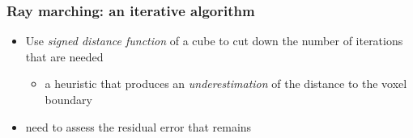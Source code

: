 \documentclass{beamer}
\begin{document}
\begin{frame}
\begin{figure}
  \end{figure}
\end{frame}

\begin{frame}
  \frametitle{Ray marching: an iterative algorithm}
  \begin{itemize}
    \item Use \textsl{signed distance function} of a cube to cut down the number of iterations that are needed
      \begin{itemize}
        \item a heuristic that produces an \textsl{underestimation} of the distance to the voxel boundary
      \end{itemize}
      \item need to assess the residual error that remains
  \end{itemize}
\end{frame}
\end{document}
